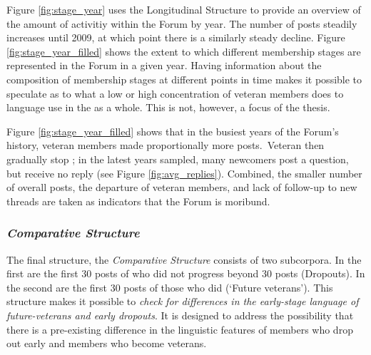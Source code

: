 Figure \ref{fig:stage_year} uses the Longitudinal Structure to provide an overview of the amount of activitiy within the \gls{Forum} by year. The number of \glspl{post} steadily increases until 2009, at which point there is a similarly steady decline. Figure \ref{fig:stage_year_filled} shows the extent to which different membership stages are represented in the \gls{Forum} in a given year. Having information about the composition of membership stages at different points in time makes it possible to speculate as to what a low or high concentration of veteran members does to language use in the  as a whole. This is not, however, a focus of the thesis.

Figure \ref{fig:stage_year_filled} shows that in the busiest years of the \gls{Forum}'s history, veteran \glspl{member} made proportionally more \glspl{post}.~Veteran  then gradually stop ; in the latest years sampled, many newcomers \gls{post} a question, but receive no reply (see Figure \ref{fig:avg_replies}). Combined, the smaller number of overall \glspl{post}, the departure of veteran \glspl{member}, and lack of follow\hyp{}up to new \glspl{thread} are taken as indicators that the \gls{Forum} is moribund.

\subsubsection*{\emph{Comparative Structure}}

The final structure, the \emph{Comparative Structure} consists of two subcorpora. In the first are the first 30 \glspl{post} of  who did not progress beyond 30 \glspl{post} (Dropouts). In the second are the first 30 \glspl{post} of those  who did (`Future veterans'). This structure makes it possible to \emph{check for differences in the early\hyp{}stage language of future\hyp{}veterans and early dropouts}. It is designed to address the possibility that there is a pre\hyp{}existing difference in the linguistic features of \glspl{member} who drop out early and \glspl{member} who become veterans.

